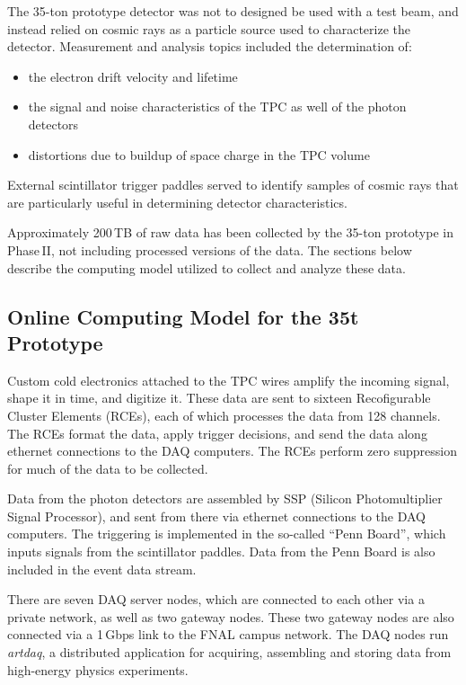 \documentclass[12pt]{article}
\begin{document}
\noindent
The 35-ton prototype detector was not to designed be used with a test beam, and instead relied on cosmic rays as
a particle source used to characterize the detector.  Measurement and analysis topics included the determination of:
\begin{itemize}
\item the electron drift velocity and lifetime
\item the signal and noise characteristics of the TPC as well of the photon detectors
\item distortions due to buildup of space charge in the TPC volume
\end{itemize}

\noindent
External scintillator trigger paddles served to identify samples of cosmic rays that are particularly useful in determining
detector characteristics.

Approximately 200\,TB of raw data has been collected by the 35-ton prototype in Phase\,II, not including processed versions of the data.
The sections below describe the computing model utilized to collect and analyze these data.

\subsection{Online Computing Model for the 35t Prototype}

Custom cold electronics attached to the TPC wires amplify the incoming signal, shape it in time,
and digitize it.  These data are sent to sixteen Recofigurable Cluster Elements (RCEs), each of which
processes the data from 128 channels.  The RCEs format the data, apply trigger decisions, and send the
data along ethernet connections to the DAQ computers.  The RCEs perform zero suppression for
much of the data to be collected.

Data from the photon detectors are assembled by SSP (Silicon Photomultiplier Signal Processor),
and sent from there via ethernet connections to the DAQ computers.  The triggering is implemented
in the so-called ``Penn Board'', which inputs signals from the scintillator paddles.  Data
from the Penn Board is also included in the event data stream.

There are seven DAQ server nodes, which are connected to each other via a private network, as well as two gateway nodes. 
These two gateway nodes are also connected via a 1\,Gbps link to the FNAL campus network. The DAQ nodes run {\it artdaq},
a distributed application for acquiring, assembling and storing data from high-energy physics experiments. 
\end{document}
